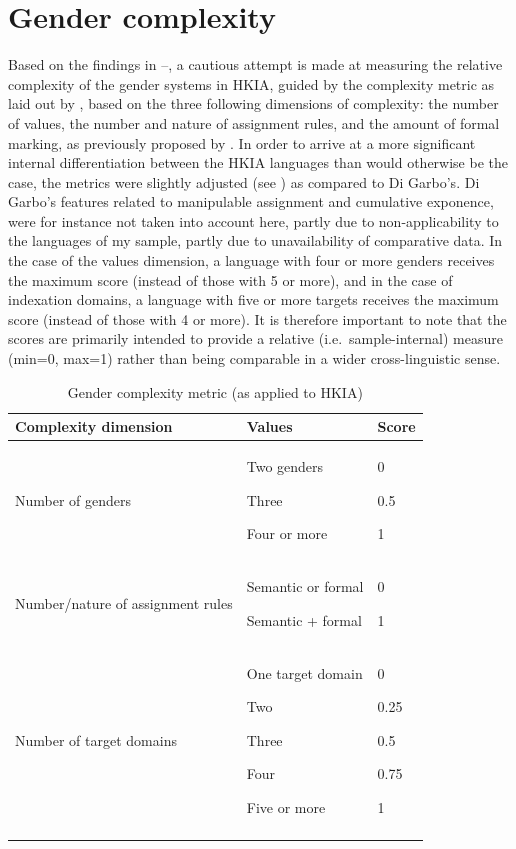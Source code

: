 \documentclass[output=collectionpaper]{langsci/langscibook}
\begin{document}
\section{Gender complexity}

Based on the findings in --, a cautious attempt is made at measuring the relative complexity of the gender systems in HKIA, guided by the complexity metric as laid out by \citet{DiGarbo2016}, based on the three following dimensions of complexity: the number of values, the number and nature of assignment rules, and the amount of formal marking, as previously proposed by \citet{Audring2014}. In order to arrive at a more significant internal differentiation between the HKIA languages than would otherwise be the case, the metrics were slightly adjusted (see ) as compared to Di Garbo's. Di Garbo's features related to manipulable assignment and cumulative exponence, were for instance not taken into account here, partly due to non-applicability to the languages of my sample, partly due to unavailability of comparative data. In the case of the values dimension, a language with four or more genders receives the maximum score (instead of those with 5 or more), and in the case of indexation domains, a language with five or more targets receives the maximum score (instead of those with 4 or more). It is therefore important to note that the scores are primarily intended to provide a relative (i.e.\ sample-internal) measure (min=0, max=1) rather than being comparable in a wider cross-linguistic sense.


\begin{table}[htb]
\begin{tabularx}{0.9\textwidth}{Xp{3cm}p{1cm}}
\lsptoprule
Complexity dimension & Values & Score\\
\midrule
Number of genders & Two genders

Three

Four or more & 0

0.5

1\\
Number/nature of assignment rules & Semantic or formal

Semantic + formal & 0

1\\
Number of target domains & One target domain

Two

Three

Four

Five or more & 0

0.25

0.5

0.75

1\\
\lspbottomrule
\end{tabularx}
\caption{Gender complexity metric (as applied to HKIA)}
\label{tab:Lilje:12}
\end{table}
\end{document}
